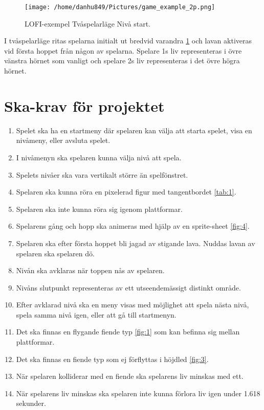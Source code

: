 \documentclass{TDP005mall}
\begin{document}
\newpage
\begin{figure}[h!]
  \caption{LOFI-exempel Tvåspelarläge Nivå start.\label{fig:8}}
  \centerline{\texttt{[image: /home/danhu849/Pictures/game\_example\_2p.png]}}  
\end{figure}
I tvåspelarläge ritas spelarna initialt ut bredvid varandra \ref{fig:8} och lavan aktiveras vid första hoppet från någon av spelarna. Spelare 1s liv representeras i övre vänstra hörnet som vanligt och spelare 2s liv representeras i det övre högra hörnet.

\section{Ska-krav för projektet} %
\begin{enumerate}
\item Spelet ska ha en startmeny där spelaren kan välja att starta spelet, visa en nivåmeny, eller avsluta spelet. 
\item I nivåmenyn ska spelaren kunna välja nivå att spela.
\item Spelets nivåer ska vara vertikalt större än spelfönstret.
\item Spelaren ska kunna röra en pixelerad figur med tangentbordet \ref{tab:1}.
\item Spelaren ska inte kunna röra sig igenom plattformar.
\item Spelarens gång och hopp ska animeras med hjälp av en sprite-sheet \ref{fig:4}.
\item Spelaren ska efter första hoppet bli jagad av stigande lava. Nuddas lavan av spelaren ska spelaren dö.
\item Nivån ska avklaras när toppen nås av spelaren.
\item Nivåns slutpunkt representeras av ett utseendemässigt distinkt område.
\item Efter avklarad nivå ska en meny visas med möjlighet att spela nästa nivå, spela samma nivå igen, eller att gå till startmenyn. 
\item Det ska finnas en flygande fiende typ \ref{fig:1} som kan befinna sig mellan plattformar.
\item Det ska finnas en fiende typ som ej förflyttas i höjdled \ref{fig:3}.
\item När spelaren kolliderar med en fiende ska spelarens liv minskas med ett.
\item När spelarens liv minskas ska spelaren inte kunna förlora liv igen under 1.618 sekunder.

\end{enumerate}
\end{document}
